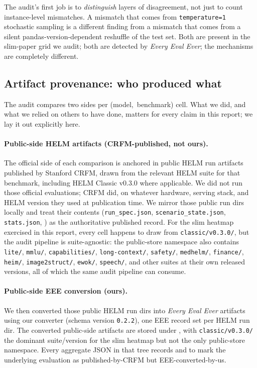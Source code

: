 \documentclass[11pt]{article}
\newcommand{\eee}{\textit{Every Eval Ever}\xspace}
\begin{document}
The audit's first job is to \emph{distinguish} layers of disagreement,
  not just to count instance-level mismatches.
A mismatch that comes from \texttt{temperature=1} stochastic sampling
  is a different finding from a mismatch that comes from a silent
  pandas-version-dependent reshuffle of the test set.
Both are present in the slim-paper grid we audit; both are detected
  by \eee{}; the mechanisms are completely different.

\subsection{Artifact provenance: who produced what}
\label{sec:tr-artifact-provenance}

The audit compares two sides per \mbox{(model, benchmark)} cell.
What we did, and what we relied on others to have done, matters for
  every claim in this report; we lay it out explicitly here.

\paragraph{Public-side HELM artifacts (CRFM-published, not ours).}
The official side of each comparison is anchored in public HELM run
  artifacts published by Stanford CRFM, drawn from the relevant
  HELM suite for that benchmark, including HELM Classic v0.3.0 where
  applicable.
We did not run those official evaluations; CRFM did, on whatever
  hardware, serving stack, and HELM version they used at publication
  time.
We mirror those public run dirs locally and treat their contents
  (\texttt{run\_spec.json}, \texttt{scenario\_state.json},
  \texttt{stats.json}, ) as the
  authoritative published record.
For the slim heatmap exercised in this report, every cell happens to
  draw from \texttt{classic/v0.3.0/}, but the audit pipeline is
  suite-agnostic: the public-store namespace also contains
  \texttt{lite/}, \texttt{mmlu/}, \texttt{capabilities/},
  \texttt{long-context/}, \texttt{safety/}, \texttt{medhelm/},
  \texttt{finance/}, \texttt{heim/}, \texttt{image2struct/},
  \texttt{ewok/}, \texttt{speech/}, and other suites at their own
  released versions, all of which the same audit pipeline can
  consume.

\paragraph{Public-side EEE conversion (ours).}
We then converted those public HELM run dirs into \eee{} artifacts
  using our  converter
  (schema version \texttt{0.2.2}), one EEE record set per
  HELM run dir.
The converted public-side artifacts are stored under
  ,
  with \texttt{classic/v0.3.0/} the dominant suite/version for the
  slim heatmap but not the only public-store namespace.
Every aggregate JSON in that tree records
  and  to
  mark the underlying evaluation as published-by-CRFM but
  EEE-converted-by-us.
\end{document}

